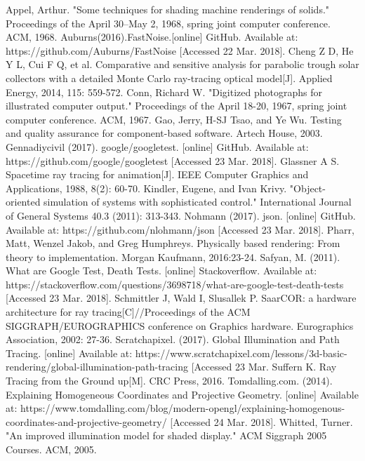\documentclass[11pt]{article}
\begin{document}
\newpage
\begin{thebibliography}{}
\bibitem[1]{}Appel, Arthur. "Some techniques for shading machine renderings of solids." Proceedings of the April 30--May 2, 1968, spring joint computer conference. ACM, 1968.
\bibitem[2]{} Auburns(2016).FastNoise.[online] GitHub. Available at: https://github.com/Auburns/FastNoise [Accessed 22 Mar. 2018].
\bibitem[3]{}Cheng Z D, He Y L, Cui F Q, et al. Comparative and sensitive analysis for parabolic trough solar collectors with a detailed Monte Carlo ray-tracing optical model[J]. Applied Energy, 2014, 115: 559-572.
\bibitem[4]{}Conn, Richard W. "Digitized photographs for illustrated computer output." Proceedings of the April 18-20, 1967, spring joint computer conference. ACM, 1967.
\bibitem[5]{}Gao, Jerry, H-SJ Tsao, and Ye Wu. Testing and quality assurance for component-based software. Artech House, 2003.
\bibitem[6]{}Gennadiycivil (2017). google/googletest. [online] GitHub. Available at: https://github.com/google/googletest [Accessed 23 Mar. 2018].
\bibitem[7]{}Glassner A S. Spacetime ray tracing for animation[J]. IEEE Computer Graphics and Applications, 1988, 8(2): 60-70.
\bibitem[8]{}Kindler, Eugene, and Ivan Krivy. "Object-oriented simulation of systems with sophisticated control." International Journal of General Systems 40.3 (2011): 313-343.
\bibitem[9]{}Nohmann (2017). json. [online] GitHub. Available at: https://github.com/nlohmann/json [Accessed 23 Mar. 2018].
\bibitem[10]{}Pharr, Matt, Wenzel Jakob, and Greg Humphreys. Physically based rendering: From theory to implementation. Morgan Kaufmann, 2016:23-24.
\bibitem[11]{}Safyan, M. (2011). What are Google Test, Death Tests. [online] Stackoverflow. Available at: https://stackoverflow.com/questions/3698718/what-are-google-test-death-tests [Accessed 23 Mar. 2018].
\bibitem[12]{}Schmittler J, Wald I, Slusallek P. SaarCOR: a hardware architecture for ray tracing[C]//Proceedings of the ACM SIGGRAPH/EUROGRAPHICS conference on Graphics hardware. Eurographics Association, 2002: 27-36.
\bibitem[13]{}Scratchapixel. (2017). Global Illumination and Path Tracing. [online] Available at: https://www.scratchapixel.com/lessons/3d-basic-rendering/global-illumination-path-tracing [Accessed 23 Mar. 
\bibitem[14]{}Suffern K. Ray Tracing from the Ground up[M]. CRC Press, 2016.
\bibitem[15]{}Tomdalling.com. (2014). Explaining Homogeneous Coordinates and Projective Geometry. [online] Available at: https://www.tomdalling.com/blog/modern-opengl/explaining-homogenous-coordinates-and-projective-geometry/ [Accessed 24 Mar. 2018].
\bibitem[16]{}Whitted, Turner. "An improved illumination model for shaded display." ACM Siggraph 2005 Courses. ACM, 2005.

\end{thebibliography}
\end{document}
